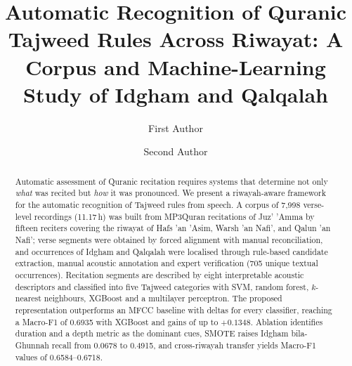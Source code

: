 \documentclass[runningheads]{llncs}
\begin{document}
\title{Automatic Recognition of Quranic Tajweed Rules Across Riwayat:
A Corpus and Machine-Learning Study of Idgham and Qalqalah}

\author{First Author \and
Second Author}

\maketitle

\begin{abstract}
Automatic assessment of Quranic recitation requires systems that determine not
only \emph{what} was recited but \emph{how} it was pronounced. We present a
riwayah-aware framework for the automatic recognition of Tajweed rules from
speech. A corpus of 7{,}998 verse-level recordings (11.17\,h) was built from
MP3Quran recitations of Juz' 'Amma by fifteen reciters covering the riwayat of
Hafs 'an 'Asim, Warsh 'an Nafi', and Qalun 'an Nafi'; verse segments were
obtained by forced alignment with manual reconciliation, and occurrences of
Idgham and Qalqalah were localised through rule-based candidate extraction,
manual acoustic annotation and expert verification (705 unique textual
occurrences). Recitation segments are described by eight interpretable acoustic
descriptors and classified into five Tajweed categories with SVM, random
forest, $k$-nearest neighbours, XGBoost and a multilayer perceptron. The
proposed representation outperforms an MFCC baseline with deltas for every
classifier, reaching a Macro-F1 of 0.6935 with XGBoost and gains of up to
$+0.1348$. Ablation identifies duration and a depth metric as the dominant
cues, SMOTE raises Idgham bila-Ghunnah recall from 0.0678 to 0.4915, and
cross-riwayah transfer yields Macro-F1 values of 0.6584--0.6718.

\end{abstract}
\end{document}
